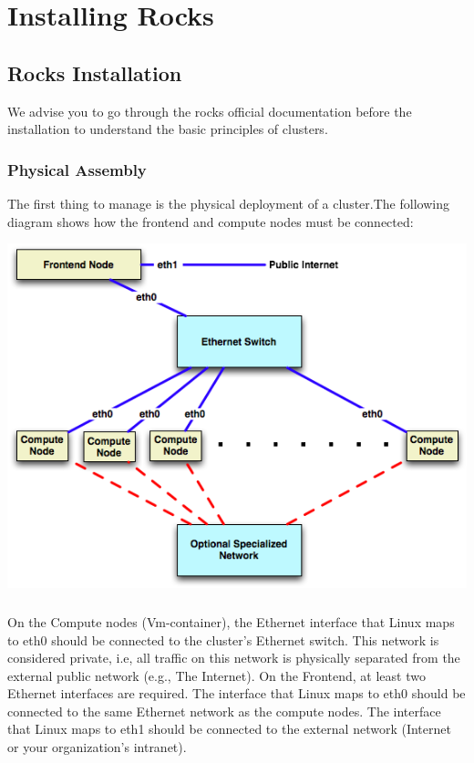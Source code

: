 \chapter{Installing Rocks}

\section{Rocks Installation}
We advise you to go through the rocks official \cite{rocksinstall} documentation  before the installation to understand the basic principles of clusters.\\
\subsection{Physical Assembly}
The first thing to manage is the physical deployment of a cluster.The following diagram shows how the frontend and compute nodes must be connected:

\includegraphics[scale=.5]{cluster.png} 
\paragraph{}
On the Compute nodes (Vm-container), the Ethernet interface that Linux maps to eth0 should be connected to the cluster's Ethernet switch. This network is considered private, i.e, all traffic on this network is physically separated from the external public network (e.g., The Internet).
On the Frontend, at least two Ethernet interfaces are required. The interface that Linux maps to eth0 should be connected to the same Ethernet network as the compute nodes. The interface that Linux maps to eth1 should be connected to the external network (Internet or your organization's intranet).
